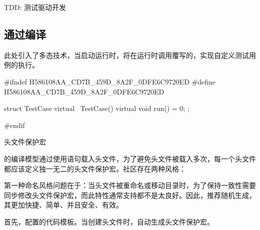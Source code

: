 \begin{content}
\begin{episode}{TDD: 测试驱动开发}
\begin{content}
\end{content}

\end{episode}

\subsection{通过编译}

此处引入了多态技术，当启动运行时，将在运行时调用覆写的，实现自定义测试用例的执行。

\begin{leftbar}
 \begin{c++}[caption={\ttfamily{include/mars/core/TestCase.h}}]
#ifndef H586108AA_CD7B_459D_8A2F_0DFE6C9720ED
#define H586108AA_CD7B_459D_8A2F_0DFE6C9720ED

struct TestCase {
  virtual ~TestCase() {}
  virtual void run() = 0;
};

#endif
  \end{c++}
\end{leftbar}

\begin{episode}{头文件保护宏}

\begin{content}

的编译模型通过使用语句载入头文件，为了避免头文件被载入多次，每一个头文件都应该定义独一无二的头文件保护宏。社区存在两种风格：

\begin{enum}
\end{enum}

第一种命名风格问题在于：当头文件被重命名或移动目录时，为了保持一致性需要同步修改头文件保护宏，而此特性通常支持都不是太良好。因此，推荐随机生成，其更加快捷、简单、并且安全、有效。

首先，配置的代码模板。当创建头文件时，自动生成头文件保护宏。


\end{content}
\end{episode}
\end{content}
